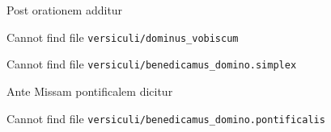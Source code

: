 \begin{rubric}Post orationem additur\end{rubric}

Cannot find file \verb|versiculi/dominus_vobiscum|

Cannot find file \verb|versiculi/benedicamus_domino.simplex|

\begin{remplacement}Ante Missam pontificalem dicitur\end{remplacement}

Cannot find file \verb|versiculi/benedicamus_domino.pontificalis|



